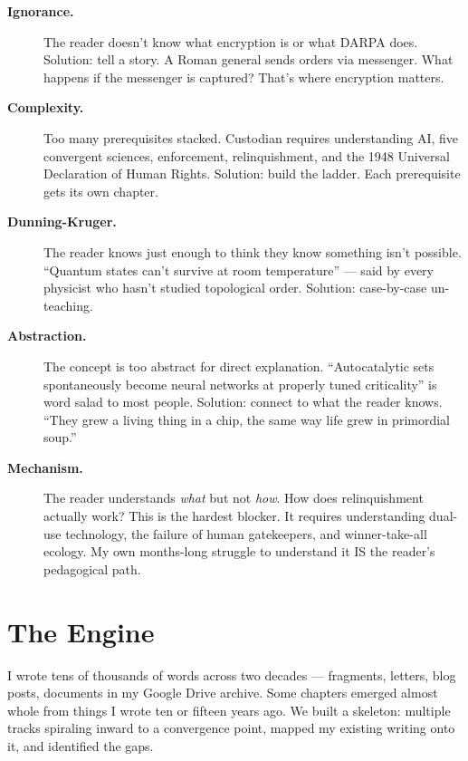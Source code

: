 \begin{description}
\item[\textbf{Ignorance.}] The reader doesn't know what encryption is or what DARPA does. Solution: tell a story. A Roman general sends orders via messenger. What happens if the messenger is captured? That's where encryption matters.

\item[\textbf{Complexity.}] Too many prerequisites stacked. Custodian requires understanding AI, five convergent sciences, enforcement, relinquishment, and the 1948 Universal Declaration of Human Rights. Solution: build the ladder. Each prerequisite gets its own chapter.

\item[\textbf{Dunning-Kruger.}] The reader knows just enough to think they know something isn't possible. ``Quantum states can't survive at room temperature'' --- said by every physicist who hasn't studied topological order. Solution: case-by-case un-teaching.

\item[\textbf{Abstraction.}] The concept is too abstract for direct explanation. ``Autocatalytic sets spontaneously become neural networks at properly tuned criticality'' is word salad to most people. Solution: connect to what the reader knows. ``They grew a living thing in a chip, the same way life grew in primordial soup.''

\item[\textbf{Mechanism.}] The reader understands \textit{what} but not \textit{how}. How does relinquishment actually work? This is the hardest blocker. It requires understanding dual-use technology, the failure of human gatekeepers, and winner-take-all ecology. My own months-long struggle to understand it IS the reader's pedagogical path.
\end{description}

\section*{The Engine}
\label{pos34b:the-engine-process}

I wrote tens of thousands of words across two decades --- fragments, letters, blog posts, documents in my Google Drive archive. Some chapters emerged almost whole from things I wrote ten or fifteen years ago. We built a skeleton: multiple tracks spiraling inward to a convergence point, mapped my existing writing onto it, and identified the gaps.


